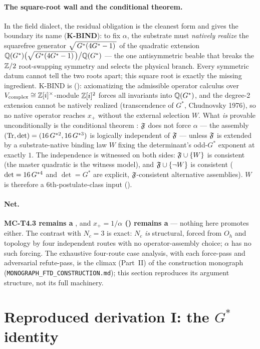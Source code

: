\paragraph{The square-root wall and the conditional theorem.} In the field
dialect, the residual obligation is the cleanest form and gives the boundary its
name (\textbf{K-BIND}): to fix $\alpha$, the substrate must \emph{natively
realize} the squarefree generator $\sqrt{\,G^{*}(4G^{*} - 1)\,}$ of the quadratic extension
$\mathbb{Q}(G^{*})\bigl(\sqrt{\,G^{*}(4G^{*} - 1)\,}\bigr)\big/\mathbb{Q}(G^{*})$ --- the one antisymmetric beable that breaks the $\mathbb{Z}/2$
root-swapping symmetry and selects the physical branch. Every symmetric datum
cannot tell the two roots apart; this square root is exactly the missing
ingredient. K-BIND is  (): axiomatizing the admissible
operator calculus over $V_{\mathrm{complex}}\cong\mathbb{Z}[i]^{\times}$-module $\mathbb{Z}[i]^{2}$ forces
all invariants into $\mathbb{Q}(G^{*})$, and the degree-2 extension cannot be natively
realized (transcendence of $G^{*}$, Chudnovsky 1976), so no native operator
reaches $x_+$ without the external selection $W$. What \emph{is} provable
unconditionally is the conditional theorem : $\mathfrak{F}$ does not force
$\alpha$ --- the assembly $(\operatorname{Tr},\operatorname{det})=(16\,G^{*2},16\,G^{*3})$ is logically
independent of $\mathfrak{F}$ --- unless $\mathfrak{F}$ is extended by a substrate-native
binding law $W$ fixing the determinant's odd-$G^{*}$ exponent at exactly $1$.
The independence is witnessed on both sides: $\mathfrak{F}\cup\{W\}$ is consistent
(the master quadratic is the witness model), and $\mathfrak{F}\cup\{\neg W\}$ is
consistent ($\det=16\,G^{*4}$ and $\det=G^{*}$ are explicit, $\mathfrak{F}$-consistent
alternative assemblies). $W$ is therefore a 6th-postulate-class input
().

\paragraph{Net.} \textbf{MC-T4.3 remains a }, and
\textbf{$x_+=1/\alpha$ () remains a } --- nothing here
promotes either. The contrast with $N_c=3$ is exact: $N_c$ \emph{is} structural,
forced from $O_h$ and topology by four independent routes with no
operator-assembly choice; $\alpha$ has no such forcing. The exhaustive
four-route case analysis, with each force-pass and adversarial refute-pass, is
the climax (Part~II) of the construction monograph
(\texttt{MONOGRAPH\_FTD\_CONSTRUCTION.md}); this section reproduces its argument
structure, not its full machinery.

\section{Reproduced derivation I: the \texorpdfstring{$G^{*}$}{G*} identity}
\label{sec:math-deriv-gstar}

